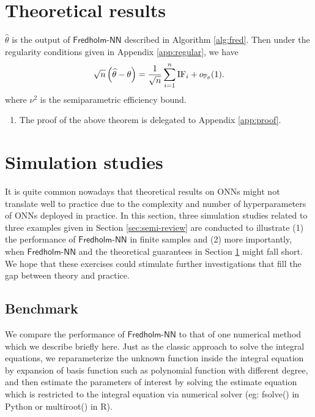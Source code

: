 \documentclass[11pt]{article}
\def\fred{\mathsf{Fredholm\mbox{-}NN}}
\begin{document}
\section{Theoretical results}
\label{sec:theory}

\begin{theorem}
\label{thm:main}
$\hat{\theta}$ is the output of $\fred$ described in Algorithm \ref{alg:fred}. Then under the regularity conditions given in Appendix \ref{app:regular}, we have
\begin{equation}
\sqrt{n} \left( \widehat{\theta} - \theta \right) = \frac{1}{\sqrt{n}} \sum_{i = 1}^{n} \mathrm{IF}_{i} + o_{{\mathbb{P}}_{\theta}} (1).
\end{equation}
where $\nu^{2}$ is the semiparametric efficiency bound.
\end{theorem}

\begin{remark}\leavevmode
\begin{enumerate}[label = (\arabic*)]
\item The proof of the above theorem is delegated to Appendix \ref{app:proof}.
\end{enumerate}
\end{remark}

\section{Simulation studies}
\label{sec:sim}

It is quite common nowadays that theoretical results on ONNs might not translate well to practice due to the complexity and number of hyperparameters of ONNs deployed in practice. In this section, three simulation studies related to three examples given in Section \ref{sec:semi-review} are conducted to illustrate (1) the performance of $\fred$ in finite samples and (2) more importantly, when $\fred$ and the theoretical guarantees in Section \ref{sec:theory} might fall short. We hope that these exercises could stimulate further investigations that fill the gap between theory and practice.

\subsection{Benchmark}

We compare the performance of $\fred$ to that of one numerical method which we describe briefly here. Just as the classic approach to solve the integral equations, we reparameterize the unknown function inside the integral equation by expansion of basis function such as polynomial function with different degree, and then estimate the parameters of interest by solving the estimate equation which is restricted to the integral equation via numerical solver (eg: fsolve() in Python or multiroot() in R). 
\end{document}
